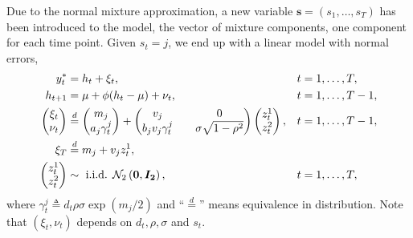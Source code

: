 Due to the normal mixture approximation, a new variable $\bm s=(s_1,\dots,s_T)$ has been introduced to the model, the vector of mixture components, one component for each time point. Given $s_t=j$, we end up with a linear model with normal errors,
\begin{equation}
\begin{alignedat}{2}\label{form:appr_model}
y_t^\ast & = h_t+\xi_t, && \quad t=1,\dots,T, \\
h_{t+1} & = \mu+\phi(h_t-\mu)+\nu_t, && \quad t=1,\dots,T-1, \\
\begin{pmatrix}
\xi_t \\
\nu_t
\end{pmatrix} &\overset{d}{=}
\begin{pmatrix}
m_j \\
a_j\gamma_t^j
\end{pmatrix} +
\begin{pmatrix}
v_j && 0 \\
b_jv_j\gamma_t^j && \sigma\sqrt{1-\rho^2}
\end{pmatrix}
\begin{pmatrix}
z_t^1 \\
z_t^2
\end{pmatrix}, && \quad t=1,\dots,T-1, \\
\xi_T &\overset{d}{=} m_j+v_jz_t^1, \\
\begin{pmatrix}
z_t^1 \\
z_t^2
\end{pmatrix}
&\sim\text{ i.i.d. }\mathcal{N}_2\left(\bm{0},\bm{I_2}\right), && \quad t=1,\dots,T,
\end{alignedat}
\end{equation}
where $\gamma_t^j\triangleq d_t\rho\sigma\exp(m_j/2)$ and ``$\overset{d}{=}$'' means equivalence in distribution. Note that $(\xi_t,\nu_t)$ depends on $d_t,\rho,\sigma$ and $s_t$.

